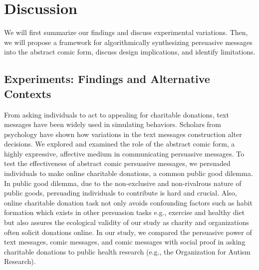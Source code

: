 \section{Discussion}
\label{sec:Discussion}
We will first summarize our findings and discuss experimental variations. Then, we will propose a framework for algorithmically synthesizing persuasive messages into the abstract comic form, discuss design implications, and identify limitations.

\subsection{Experiments: Findings and Alternative Contexts}
\label{sub:Experiments: Findings and Alternate Contexts}

From asking individuals to act to appealing for charitable donations, text messages have been widely used in simulating behaviors. Scholars from psychology have shown how variations in the text messages construction alter decisions. We explored and examined the role of the abstract comic form, a highly expressive, affective medium in communicating persuasive messages. To test the effectiveness of abstract comic persuasive messages, we persuaded individuals to make online charitable donations, a common public good dilemma. In public good dilemma, due to the non-exclusive and non-rivalrous nature of public goods, persuading individuals to contribute is hard and crucial. Also, online charitable donation task not only avoids confounding factors such as habit formation which exists in other persuasion tasks e.g., exercise and healthy diet but also assures the ecological validity of our study as charity and organizations often solicit donations online. In our study, we compared the persuasive power of text messages, comic messages, and comic messages with social proof in asking charitable donations to public health research (e.g., the Organization for Autism Research).


